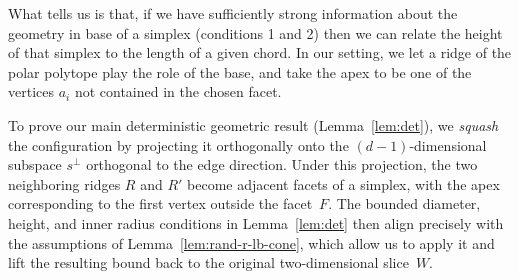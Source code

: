 \documentclass{article}\usepackage[a4paper,margin=20mm]{geometry}
\begin{document}
What  tells us is that, if we have sufficiently strong information about the geometry in base of a simplex (conditions 1 and 2)
then we can relate the height of that simplex to the length of a given chord. In our setting, we let a ridge of the polar polytope play the role of the base, and take the apex to be one of the vertices $a_i$ not contained in the chosen facet.

To prove our main deterministic geometric result (Lemma~\ref{lem:det}), we \emph{squash} the configuration by projecting it orthogonally onto the $(d-1)$-dimensional subspace $s^\perp$ orthogonal to the edge direction. Under this projection, the two neighboring ridges $R$ and $R'$ become adjacent facets of a simplex, with the apex corresponding to the first vertex outside the facet~$F$. The bounded diameter, height, and inner radius conditions in Lemma~\ref{lem:det} then align precisely with the assumptions of Lemma~\ref{lem:rand-r-lb-cone}, which allow us to apply it and lift the resulting bound back to the original two-dimensional slice~$W$.
\end{document}
